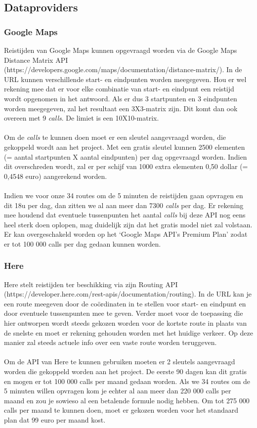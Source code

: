 \documentclass[ps,a4paper,oneside]{report}
\begin{document}
\subsection{Dataproviders}
\subsubsection{Google Maps}
Reistijden van Google Maps kunnen opgevraagd worden via de Google Maps Distance Matrix API (https://developers.google.com/maps/documentation/distance-matrix/). In de URL kunnen verschillende start- en eindpunten worden meegegeven. Hou er wel rekening mee dat er voor elke combinatie van start- en eindpunt een reistijd wordt opgenomen in het antwoord. Als er dus 3 startpunten en 3 eindpunten worden meegegeven, zal het resultaat een 3X3-matrix zijn. Dit komt dan ook overeen met 9 \textit{calls}. De limiet is een 10X10-matrix.\\\\
Om de \textit{calls} te kunnen doen moet er een sleutel aangevraagd worden, die gekoppeld wordt aan het project. Met een gratis sleutel kunnen 2500 elementen (= aantal startpunten X aantal eindpunten) per dag opgevraagd worden. Indien dit overschreden wordt, zal er per schijf van 1000 extra elementen 0,50 dollar (= 0,4548 euro) aangerekend worden.\\\\
Indien we voor onze 34 routes om de 5 minuten de reistijden gaan opvragen en dit 18u per dag, dan zitten we al aan meer dan 7300 \textit{calls} per dag. Er rekening mee houdend dat eventuele tussenpunten het aantal \textit{calls} bij deze API nog eens heel sterk doen oplopen, mag duidelijk zijn dat het gratis model niet zal volstaan. Er kan overgeschakeld worden op het ‘Google Maps API’s Premium Plan’ zodat er tot 100 000 calls per dag gedaan kunnen worden.

\subsubsection{Here}
Here stelt reistijden ter beschikking via zijn Routing API (https://developer.here.com/rest-apis/documentation/routing). In de URL kan je een route meegeven door de co\"ordinaten in te stellen voor start- en eindpunt en door eventuele tussenpunten mee te geven. Verder moet voor de toepassing die hier ontworpen wordt steeds gekozen worden voor de kortste route in plaats van de snelste en moet er rekening gehouden worden met het huidige verkeer. Op deze manier zal steeds actuele info over een vaste route worden teruggeven.\\\\
Om de API van Here te kunnen gebruiken moeten er 2 sleutels aangevraagd worden die gekoppeld worden aan het project. De eerste 90 dagen kan dit gratis en mogen er tot 100 000 calls per maand gedaan worden. Als we 34 routes om de 5 minuten willen opvragen kom je echter al aan meer dan 220 000 calls per maand en zou je sowieso al een betalende formule nodig hebben. Om tot 275 000 calls per maand te kunnen doen, moet er gekozen worden voor het standaard plan dat 99 euro per maand kost.
\end{document}
